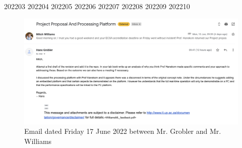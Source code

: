 \documentclass[11pt,a4paper]{isglabbook}
\begin{document}



{\small\cmbrfamily\tableofcontents}
\newpage

\renewcommand{\baselinestretch}{1.5}
{202203}
{202204}
{202205}
{202206}
{202207}
{202208}
{202209}
{202210}

\newpage
\appendix
\appendixpage
\addappheadtotoc


\begin{figure}[h]
  \centering
  \includegraphics[width=0.9\linewidth]{2022/figures/appendix/email_embedded.png}
  \caption{Email dated Friday 17 June 2022 between Mr. Grobler and Mr. Williams}
  \label{fig:grobler_email}
\end{figure}


\newpage
{}



\newpage
{}
\printindex

\end{document}
